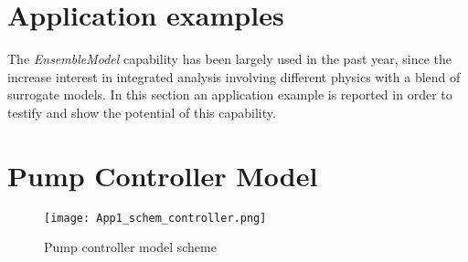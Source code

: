 \section{Application examples}
\label{sec:applications}
The \textit{EnsembleModel} capability has been largely used in the past year, since the increase interest in
integrated analysis involving different physics with a blend of surrogate models.
In this section an application example is reported in order to testify and show the potential of this capability.
\section{Pump Controller Model}
\label{sec:pumpControllerModel}
\begin{figure}
    \centering
    \texttt{[image: App1\_schem\_controller.png]}
    \caption{Pump controller model scheme}
    \label{fig:ensembleModelApp1Controller}
\end{figure}

